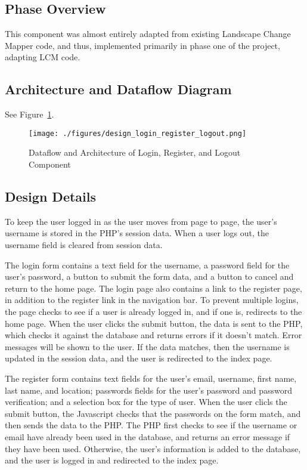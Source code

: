 \subsection{Phase Overview}
This component was almost entirely adapted from existing Landscape Change Mapper code, and thus, implemented primarily in phase one of the project, adapting LCM code. 

\subsection{ Architecture and Dataflow Diagram}
See Figure~\ref{design_login_register_logout}.
\begin{figure}[tbh]
\begin{center}
\texttt{[image: ./figures/design\_login\_register\_logout.png]}
\end{center}
\caption{Dataflow and Architecture of Login, Register, and Logout Component \label{design_login_register_logout}}
\end{figure}

\subsection{Design Details}
To keep the user logged in as the user moves from page to page, the user's username is stored in the PHP's session data. When a user logs out, the username field is cleared from session data. 

The login form contains a text field for the username, a password field for the user's password, a button to submit the form data, and a button to cancel and return to the home page. The login page also contains a link to the register page, in addition to the register link in the navigation bar.  To prevent multiple logins, the page checks to see if a user is already logged in, and if one is, redirects to the home page. When the user clicks the submit button, the data is sent to the PHP, which checks it against the database and returns errors if it doesn't match. Error messages will be shown to the user. If the data matches, then the username is updated in the session data, and the user is redirected to the index page. 

The register form contains text fields for the user's email, username, first name, last name, and location; passwords fields for the user's password and password verification; and a selection box for the type of user. When the user clicls the submit button, the Javascript checks that the passwords on the form match, and then sends the data to the PHP. The PHP first checks to see if the username or email have already been used in the database, and returns an error message if they have been used. Otherwise, the user's information is added to the database, and the user is logged in and redirected to the index page.


